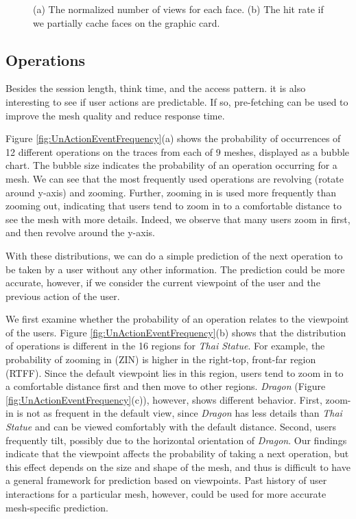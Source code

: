 \begin{figure}[htp!]
\begin{center}
\caption{(a) The normalized number of views for each face. (b) The hit rate if we partially cache faces on the graphic card.\label{fig:heat_map}}
\end{center}
\end{figure}

\subsection{Operations}
Besides the session length, think time, and the access pattern.
it is also interesting to see if user actions are predictable. 
If so, pre-fetching can be used to improve the mesh quality and reduce response time.  

Figure \ref{fig:UnActionEventFrequency}(a) shows the probability of occurrences of 12 different operations on the traces from each of 9 meshes,
displayed as a bubble chart. The bubble size indicates the probability of an operation occurring for a mesh.
We can see that the most frequently used operations are revolving (rotate around y-axis) and zooming.  
Further, zooming in is used more frequently than zooming out, 
indicating that users tend to zoom in to a comfortable distance to see the mesh with more details.  
Indeed, we observe that many users zoom in first, 
and then revolve around the y-axis.  %

With these distributions, we can do a simple prediction of the next operation to be taken 
by a user without any other information.  
The prediction could be more accurate, however, if we consider 
the current viewpoint of the user and the previous action of the user.

We first examine whether the probability of an operation relates to
the viewpoint of the users.  Figure
\ref{fig:UnActionEventFrequency}(b) shows that the distribution of
operations is different in the 16 regions for \textit{Thai Statue}.
For example, the probability of zooming in (ZIN)
is higher in the right-top, front-far region (RTFF).  Since
the default viewpoint lies in this region, users tend to zoom in to a
comfortable distance first and then move to other regions.  
\textit{Dragon} (Figure
\ref{fig:UnActionEventFrequency}(c)), however, shows different
behavior.  First, zoom-in is not as frequent in the
default view, since \textit{Dragon} has less details than \textit{Thai
Statue} and can be viewed comfortably with the default distance.
Second, users frequently tilt, possibly due to 
the horizontal orientation of \textit{Dragon}.  Our
findings indicate that the viewpoint affects the probability of taking a next operation, 
but this effect depends on the size and shape of the mesh,
and thus is difficult to have a general framework for prediction based
on viewpoints.  
Past history of user interactions for a particular mesh, 
however, could be used for more accurate mesh-specific prediction.

